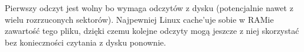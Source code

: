 Pierwszy odczyt jest wolny bo wymaga odczytów z dysku (potencjalnie nawet z wielu rozrzuconych sektorów).
Najpewniej Linux cache'uje sobie w RAMie zawartość tego pliku, dzięki czemu kolejne odczyty mogą jeszcze z niej skorzystać bez konieczności czytania z dysku ponownie.